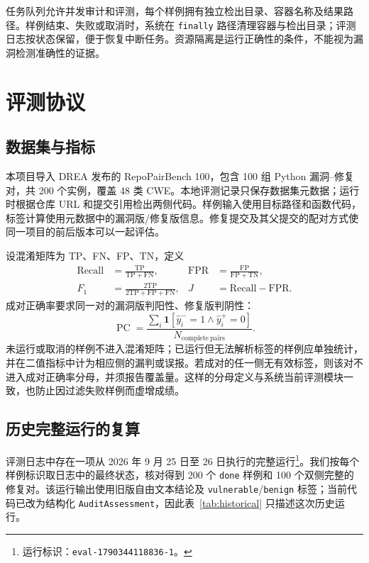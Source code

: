 \documentclass[UTF8,a4paper,11pt,fontset=fandol]{ctexart}
\newcommand{\DREA}{\textsc{DREA}}
\newcommand{\RPC}{\operatorname{PC}}
\begin{document}
任务队列允许并发审计和评测，每个样例拥有独立检出目录、容器名称及结果路径。样例结束、失败或取消时，系统在 \texttt{finally} 路径清理容器与检出目录；评测日志按状态保留，便于恢复中断任务。资源隔离是运行正确性的条件，不能视为漏洞检测准确性的证据。

\section{评测协议}
\subsection{数据集与指标}
本项目导入 \DREA{} 发布的 RepoPairBench 100，包含 100 组 Python 漏洞--修复对，共 200 个实例，覆盖 48 类 CWE\cite{drea2026}。本地评测记录只保存数据集元数据；运行时根据仓库 URL 和提交引用检出两侧代码。样例输入使用目标路径和函数代码，标签计算使用元数据中的漏洞版/修复版信息。修复提交及其父提交的配对方式使同一项目的前后版本可以一起评估。

设混淆矩阵为 TP、FN、FP、TN，定义
\begin{align}
\mathrm{Recall}&=\frac{\mathrm{TP}}{\mathrm{TP}+\mathrm{FN}}, &
\mathrm{FPR}&=\frac{\mathrm{FP}}{\mathrm{FP}+\mathrm{TN}},\\
F_1&=\frac{2\mathrm{TP}}{2\mathrm{TP}+\mathrm{FP}+\mathrm{FN}}, &
J&=\mathrm{Recall}-\mathrm{FPR}.
\end{align}
成对正确率要求同一对的漏洞版判阳性、修复版判阴性：
\begin{equation}
\RPC=\frac{\sum_i \mathbf{1}[\hat y_i^{-}=1\land\hat y_i^{+}=0]}{N_{\mathrm{complete\ pairs}}}.
\end{equation}
未运行或取消的样例不进入混淆矩阵；已运行但无法解析标签的样例应单独统计，并在二值指标中计为相应侧的漏判或误报。若成对的任一侧无有效标签，则该对不进入成对正确率分母，并须报告覆盖量。这样的分母定义与系统当前评测模块一致，也防止因过滤失败样例而虚增成绩。

\subsection{历史完整运行的复算}
评测日志中存在一项从 2026 年 9 月 25 日至 26 日执行的完整运行\footnote{运行标识：\texttt{eval-1790344118836-1}。}。我们按每个样例标识取日志中的最终状态，核对得到 200 个 \texttt{done} 样例和 100 个双侧完整的修复对。该运行输出使用旧版自由文本结论及 \texttt{vulnerable}/\texttt{benign} 标签；当前代码已改为结构化 \texttt{AuditAssessment}，因此表~\ref{tab:historical} 只描述这次历史运行。
\end{document}
